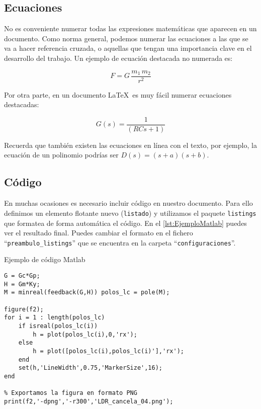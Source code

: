 \documentclass[11pt]{article}
\begin{document}
\subsection{Ecuaciones}
\label{sec:ejemplos:ecuaciones}

No es conveniente numerar todas las expresiones matemáticas que aparecen en un documento. Como norma general, podemos numerar las ecuaciones a las que se va a hacer referencia cruzada, o aquellas que tengan una importancia clave en el desarrollo del trabajo. Un ejemplo de ecuación destacada no numerada es:

\begin{equation*} %
    F = G\,\frac{m_1\,m_2}{r^2}
\end{equation*}

Por otra parte, en un documento \LaTeX\ es muy fácil numerar ecuaciones destacadas:

\begin{equation}\label{eqn:fdt}
    G(s) = \frac{1}{(RCs+1)}
\end{equation}
	
Recuerda que también existen las ecuaciones en línea con el texto, por ejemplo, la ecuación de un polinomio podrías ser $D(s) = (s+a)(s+b)$.

\subsection{Código}

En muchas ocasiones es necesario incluir código en nuestro documento. Para ello definimos un elemento flotante nuevo (\texttt{listado}) y utilizamos el paquete \texttt{listings} que formatea de forma automática el código. En el \autoref{lst:EjemploMatlab} puedes ver el resultado final. Puedes cambiar el formato en el fichero ``\texttt{preambulo\_listings}'' que se encuentra en la carpeta ``\texttt{configuraciones}''.

\begin{listado}
\caption{Ejemplo de código Matlab}
\label{lst:EjemploMatlab}
\begin{lstlisting}
G = Gc*Gp;
H = Gm*Ky;
M = minreal(feedback(G,H)) polos_lc = pole(M);

figure(f2);
for i = 1 : length(polos_lc)
    if isreal(polos_lc(i))
        h = plot(polos_lc(i),0,'rx');
    else
        h = plot([polos_lc(i),polos_lc(i)'],'rx');
    end
    set(h,'LineWidth',0.75,'MarkerSize',16);
end

% Exportamos la figura en formato PNG
print(f2,'-dpng','-r300','LDR_cancela_04.png');
\end{lstlisting}
\end{listado}
\end{document}
